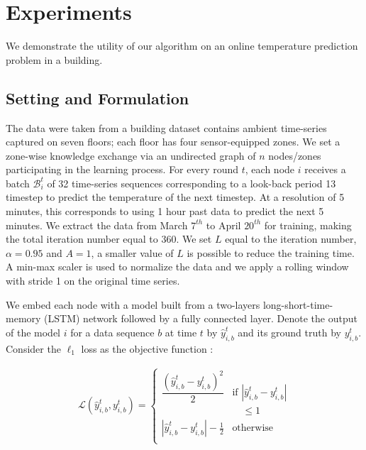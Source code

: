 \section{Experiments}
\label{chap:experiments }


We demonstrate the utility of our algorithm on an online temperature prediction problem in a building. 

\subsection{Setting and Formulation} 
The data were taken from a building dataset contains ambient time-series captured on seven floors; each floor has four sensor-equipped zones. We set a zone-wise knowledge exchange via an undirected graph of $n$ nodes/zones participating in the learning process. For every round $t$, each node $i$ receives a batch $\mathcal{B}^t_i$ of 32 time-series sequences corresponding to a look-back period 13 timestep to predict the temperature of the next timestep. At a resolution of 5 minutes, this corresponds to using 1 hour past data to predict the next 5 minutes. We extract the data from March $7^{th}$ to April $20^{th}$ for training, making the total iteration number equal to 360.  We set $L$ equal to the iteration number, $\alpha = 0.95$ and $A = 1$, a smaller value of $L$ is possible to reduce the training time. A min-max scaler is used to normalize the data and we apply a rolling window with stride 1 on the original time series.

We embed each node with a model built from a two-layers long-short-time-memory (LSTM) network followed by a fully connected layer. Denote the output of the model $i$ for a data sequence $b$ at time $t$  by $\hat{y}^t_{i,b}$ and its ground truth by $y^t_{i,b}$. Consider the $\ell_1$ loss as the objective function :
\begin{linenomath}
    \begin{align*}
        \mathcal{L}(\hat{y}^t_{i,b},y^t_{i,b}) =
        \begin{cases}
      \dfrac{(\hat{y}^t_{i,b}-y^t_{i,b})^2}{2} &\text{if } |\hat{y}^t_{i,b}-y^t_{i,b} | \\ & \quad \leq 1 \\
      |\hat{y}^t_{i,b}-y^t_{i,b}| - \frac{1}{2}& \text{otherwise}\\
    \end{cases}
    \end{align*}
\end{linenomath}

